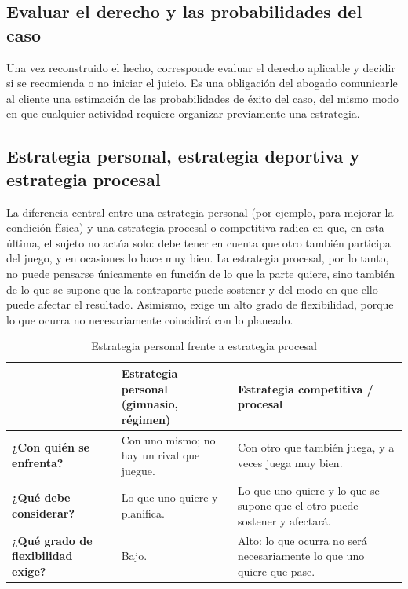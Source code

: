\documentclass[12pt,oneside]{book}
\begin{document}
\subsection{Evaluar el derecho y las probabilidades del caso}

Una vez reconstruido el hecho, corresponde evaluar el derecho aplicable y decidir si se recomienda o no iniciar el juicio. Es una obligación del abogado comunicarle al cliente una estimación de las probabilidades de éxito del caso, del mismo modo en que cualquier actividad requiere organizar previamente una estrategia.

\subsection{Estrategia personal, estrategia deportiva y estrategia procesal}

La diferencia central entre una estrategia personal (por ejemplo, para mejorar la condición física) y una estrategia procesal o competitiva radica en que, en esta última, el sujeto no actúa solo: debe tener en cuenta que otro también participa del juego, y en ocasiones lo hace muy bien. La estrategia procesal, por lo tanto, no puede pensarse únicamente en función de lo que la parte quiere, sino también de lo que se supone que la contraparte puede sostener y del modo en que ello puede afectar el resultado. Asimismo, exige un alto grado de flexibilidad, porque lo que ocurra no necesariamente coincidirá con lo planeado.

\begin{table}[H]
\centering
\caption{Estrategia personal frente a estrategia procesal}
\begin{tabularx}{\textwidth}{>{\raggedright\arraybackslash}p{} X X}
\toprule
 & \textbf{Estrategia personal (gimnasio, régimen)} & \textbf{Estrategia competitiva / procesal} \\
\midrule
\textbf{¿Con quién se enfrenta?} & Con uno mismo; no hay un rival que juegue. & Con otro que también juega, y a veces juega muy bien. \\
\textbf{¿Qué debe considerar?} & Lo que uno quiere y planifica. & Lo que uno quiere y lo que se supone que el otro puede sostener y afectará. \\
\textbf{¿Qué grado de flexibilidad exige?} & Bajo. & Alto: lo que ocurra no será necesariamente lo que uno quiere que pase. \\
\bottomrule
\end{tabularx}
\end{table}
\end{document}
